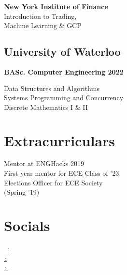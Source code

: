 \documentclass[]{deedy-resume-openfont}
\begin{document}
\begin{minipage}[t]{0.33\textwidth}
\textbf{New York Institute of Finance} \\
\textbullet{} Introduction to Trading,  \\
\hspace{0.65em} Machine Learning \& GCP 
\sectionsep
\subsection{University of Waterloo}
\textbf{BASc. Computer Engineering 2022}

\textbullet{} Data Structures and Algorithms \\
\textbullet{} Systems Programming and Concurrency \\
\textbullet{} Discrete Mathematics I \& II \\



\sectionsep


\section{Extracurriculars} 
\textbullet{} Mentor at ENGHacks 2019 \\
\textbullet{} First-year mentor for ECE Class of '23 \\
\textbullet{} Elections Officer for ECE Society \\ 
\hspace{0.7em}(Spring '19) 

\sectionsep


\section{Socials}
\href{https://www.linkedin.com/in/mhabaig/}{\faLinkedinSquare \, : } \\
\href{https://github.com/baighamza}{\faGithubSquare \,: } \\
\href{http://www.hamzais.me/}{\faGlobe\,:\,}




%
%

\end{minipage} 
\hfill
\end{document}
